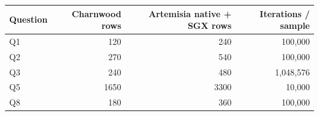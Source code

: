 \begin{tabular}{lrrr}
\toprule
Question & Charnwood rows & Artemisia native + SGX rows & Iterations / sample \\
\midrule
Q1 & 120 & 240 & 100,000 \\
Q2 & 270 & 540 & 100,000 \\
Q3 & 240 & 480 & 1,048,576 \\
Q5 & 1650 & 3300 & 10,000 \\
Q8 & 180 & 360 & 100,000 \\
\bottomrule
\end{tabular}
